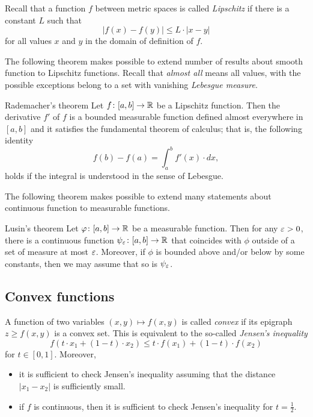 Recall that a function $f$ between metric spaces is called \emph{Lipschitz} if there is a constant $L$ such that 
\[|f(x)-f(y)|\le L\cdot|x-y|\]
for all values $x$ and $y$ in the domain of definition of $f$.

The following theorem makes possible to extend number of results about smooth function to Lipschitz functions.
Recall that {}\emph{almost all} means all values, with the possible exceptions belong to a set with vanishing {}\emph{Lebesgue measure}.

\begin{thm}{Rademacher's theorem}\label{thm:rademacher}
Let $f\colon[a,b]\to\mathbb{R}$ be a Lipschitz function.
Then the derivative $f'$ of $f$ is a bounded measurable function defined almost everywhere in $[a,b]$ and it satisfies the fundamental theorem of calculus; that is, the following identity 
\[f(b)-f(a)=\int_a^b f'(x)\cdot dx,\]
holds if the integral is understood in the sense of Lebesgue.
\end{thm}

The following theorem makes possible to extend many statements about continuous function to measurable functions.

\begin{thm}{Lusin's theorem}\label{thm:lusin}
Let $\varphi\colon[a,b]\to \mathbb{R}$ be a measurable function.
Then for any $\varepsilon>0$, there is a continuous function $\psi_\varepsilon\colon[a,b]\to \mathbb{R}$ that coincides with $\phi$ outside of a set of measure at most $\varepsilon$.
Moreover, if $\phi$ is bounded above and/or below by some constants, then we may assume that so is $\psi_\varepsilon$.  
\end{thm}

\subsection*{Convex functions}

A function of two variables $(x,y)\mapsto f(x,y)$ is called \emph{convex} if 
its epigraph $z\ge f(x,y)$ is a convex set.
This is equivalent to the so-called \emph{Jensen's inequality}
\[f \left (t\cdot x_1 + (1-t)\cdot x_2 \right ) \leq t\cdot f(x_1)+ (1-t)\cdot f(x_2)\]
for $t\in[0,1]$.
Moreover, 
\begin{itemize}
\item it is sufficient to check Jensen's inequality assuming that the distance $|x_1-x_2|$ is sufficiently small.
\item if $f$ is continuous, then it is sufficient to check Jensen's inequality for $t=\tfrac12$.
\end{itemize}



